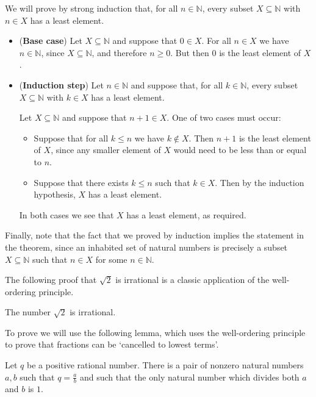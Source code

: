 \begin{cproof}
We will prove by strong induction that, for all $n \in \mathbb{N}$, every subset $X \subseteq \mathbb{N}$ with $n \in X$ has a least element.

\begin{itemize}
\item (\textbf{Base case}) Let $X \subseteq \mathbb{N}$ and suppose that $0 \in X$. For all $n \in X$ we have $n \in \mathbb{N}$, since $X \subseteq \mathbb{N}$, and therefore $n \ge 0$. But then $0$ is the least element of $X$.
\item (\textbf{Induction step}) Let $n \in \mathbb{N}$ and suppose that, for all $k \in \mathbb{N}$, every subset $X \subseteq \mathbb{N}$ with $k \in X$ has a least element.

Let $X \subseteq \mathbb{N}$ and suppose that $n+1 \in X$. One of two cases must occur:
\begin{itemize}
\item Suppose that for all $k \le n$ we have $k \not\in X$. Then $n+1$ is the least element of $X$, since any smaller element of $X$ would need to be less than or equal to $n$.
\item Suppose that there exists $k \le n$ such that $k \in X$. Then by the induction hypothesis, $X$ has a least element.
\end{itemize}
In both cases we see that $X$ has a least element, as required.
\end{itemize}

Finally, note that the fact that we proved by induction implies the statement in the theorem, since an inhabited set of natural numbers is precisely a subset $X \subseteq \mathbb{N}$ such that $n \in X$ for some $n \in \mathbb{N}$.
\end{cproof}

The following proof that $\sqrt{2}$ is irrational is a classic application of the well-ordering principle.

\begin{proposition}
\label{propSqrt2Irrational}
The number $\sqrt{2}$ is irrational.
\end{proposition}

To prove  we will use the following lemma, which uses the well-ordering principle to prove that fractions can be `cancelled to lowest terms'.

\begin{lemma}
\label{lemFractionInLowestTerms}
Let $q$ be a positive rational number. There is a pair of nonzero natural numbers $a,b$ such that $q=\frac{a}{b}$ and such that the only natural number which divides both $a$ and $b$ is $1$.
\end{lemma}


